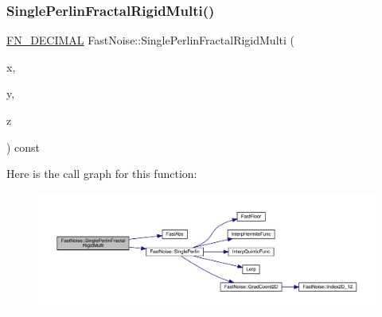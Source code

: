 \subsubsection{\texorpdfstring{Single\+Perlin\+Fractal\+Rigid\+Multi()}{SinglePerlinFractalRigidMulti()}\hspace{0.1cm}{\footnotesize\ttfamily [2/2]}}
{\footnotesize\ttfamily \mbox{\hyperlink{_fast_noise_8h_a75a9ef6d2541c4921815b885bfd449c3}{F\+N\+\_\+\+D\+E\+C\+I\+M\+AL}} Fast\+Noise\+::\+Single\+Perlin\+Fractal\+Rigid\+Multi (\begin{DoxyParamCaption}\item[{\mbox{\hyperlink{_fast_noise_8h_a75a9ef6d2541c4921815b885bfd449c3}{F\+N\+\_\+\+D\+E\+C\+I\+M\+AL}}}]{x,  }\item[{\mbox{\hyperlink{_fast_noise_8h_a75a9ef6d2541c4921815b885bfd449c3}{F\+N\+\_\+\+D\+E\+C\+I\+M\+AL}}}]{y,  }\item[{\mbox{\hyperlink{_fast_noise_8h_a75a9ef6d2541c4921815b885bfd449c3}{F\+N\+\_\+\+D\+E\+C\+I\+M\+AL}}}]{z }\end{DoxyParamCaption}) const\hspace{0.3cm}{\ttfamily [private]}}

Here is the call graph for this function\+:
\nopagebreak
\begin{figure}[H]
\begin{center}
\leavevmode
\includegraphics[width=350pt]{class_fast_noise_ad5d0bbafb8bc1e07c3d771455736600d_cgraph}
\end{center}
\end{figure}
\mbox{\label{class_fast_noise_a1aa539b6129719546bb4ed2847f1a11f}} 
